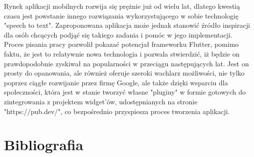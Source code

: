 \documentclass[12pt, a4paper]{article}
\begin{document}
\begin{sloppypar}
{  Rynek aplikacji mobilnych rozwija się prężnie już od wielu lat, dlatego kwestią czasu
  jest powstanie innego rozwiązania wykorzystującego w sobie technologię "speech to text".
  Zaproponowana aplikacja może jednak stanowić źródło inspiracji dla osób chcących podjąć
  się takiego zadania i pomóc w jego implementacji. Proces pisania pracy pozwolił pokazać
  potencjał frameworku Flutter, pomimo faktu, że jest to relatywnie nowa technologia i
  pozwala stwierdzić, iż będzie on prawdopodobnie zyskiwał na popularności w przeciągu
  następujących lat. Jest on prosty do opanowania, ale również oferuje szeroki wachlarz
  możliwości, nie tylko poprzez ciągłe rozwijanie przez firmę Google, ale także dzięki
  wsparciu dla społeczności, która jest w stanie tworzyć własne "pluginy" w formie
  gotowych do zintegrowania z projektem widget'ów, udostępnianych na stronie
  "https://pub.dev/", co bezpośrednio przyspiesza proces tworzenia aplikacji.
}
\listoffigures

\section{Bibliografia}
{
  \printbibliography
}

\end{sloppypar}
\end{document}

